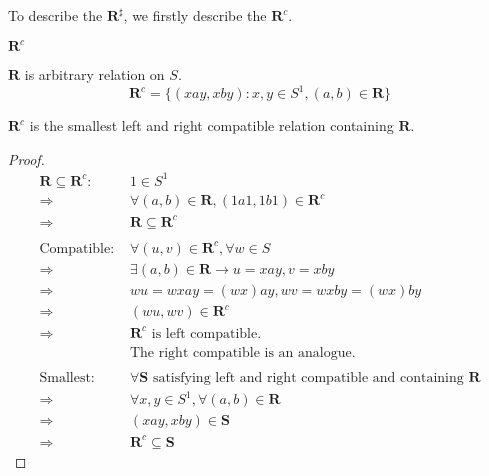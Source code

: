 To describe the $\mathbf{R}^{\sharp}$, we firstly describe the $\mathbf{R}^{c}$.

\begin{Def}$\mathbf{R}^{c}$
    
    $\mathbf{R}$ is arbitrary relation on $S$.
    \[
        \mathbf{R}^{c} =
        \{
            (xay, xby): x,y \in S^1, (a,b)\in \mathbf{R}
        \}
    \]
\end{Def}

\begin{Lem}\label{Lem:1.5.5}
    $\mathbf{R}^c$ is the smallest left and right compatible relation containing $\mathbf{R}$.
    \begin{proof}
         \begin{align*}
            \mathbf{R}\subseteq \mathbf{R}^c \text{: } & 1 \in S^1    \\
            \Rightarrow & \forall (a,b) \in \mathbf{R}, (1a1,1b1) \in \mathbf{R}^c  \\
            \Rightarrow & \mathbf{R} \subseteq \mathbf{R}^c \\
            & \\
            \text{Compatible: } & \forall (u,v) \in \mathbf{R}^c,\forall w \in S  \\
            \Rightarrow & \exists (a,b)\in \mathbf{R}\rightarrow u=xay, v=xby   \\
            \Rightarrow & wu = wxay = (wx)ay, wv = wxby = (wx)by  \\
            \Rightarrow & (wu, wv) \in \mathbf{R}^c \\
            \Rightarrow & \mathbf{R}^c \text{ is left compatible.}  \\
            & \text{The right compatible is an analogue.}   \\
            & \\
            \text{Smallest: } & \forall \mathbf{S} \text{ satisfying left and right compatible and containing } \mathbf{R}   \\
            \Rightarrow & \forall x,y \in S^1, \forall (a,b) \in \mathbf{R} \\
            \Rightarrow & (xay, xby) \in \mathbf{S} \\
            \Rightarrow & \mathbf{R}^c \subseteq \mathbf{S}
         \end{align*}
    \end{proof}
\end{Lem}

